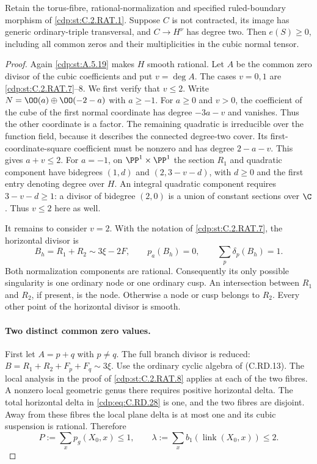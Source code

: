 
\begin{proposition}\label{cdp:st:C.2.RAT.9}
Retain the torus-fibre, rational-normalization and specified
ruled-boundary morphism of \ref{cdp:st:C.2.RAT.1}. Suppose $C$ is not
contracted, its image has generic ordinary-triple transversal,
and $C\to H^\nu$ has degree two. Then $e(S)\ge0$,
including all common zeros and their multiplicities in
the cubic normal tensor.
\end{proposition}
\begin{proof}
Again \ref{cdp:st:A.5.19} makes $H$ smooth rational. Let $A$ be the
common zero divisor of the cubic coefficients and put
$v=\deg A$. The cases $v=0,1$ are \ref{cdp:st:C.2.RAT.7}--8.
We first verify that $v\le2$. Write
$N=\OO(a)\oplus\OO(-2-a)$ with $a\ge-1$.
For $a\ge0$ and $v>0$, the coefficient of the cube
of the first normal coordinate has degree $-3a-v$
and vanishes. Thus the other coordinate is a factor.
The remaining quadratic is irreducible over the
function field, because it describes the connected
degree-two cover. Its first-coordinate-square
coefficient must be nonzero and has degree
$2-a-v$. This gives $a+v\le2$.
For $a=-1$, on $\PP^1\times\PP^1$ the section
$R_1$ and quadratic component have bidegrees
$(1,d)$ and $(2,3-v-d)$, with $d\ge0$ and the
first entry denoting degree over $H$. An integral
quadratic component requires $3-v-d\ge1$:
a divisor of bidegree $(2,0)$ is a union of
constant sections over $\C$. Thus $v\le2$ here
as well.

It remains to consider $v=2$. With the notation
of \ref{cdp:st:C.2.RAT.7}, the horizontal divisor is
\[
 B_h=R_1+R_2\sim3\xi-2F,
       \qquad p_a(B_h)=0,
       \qquad \sum_p\delta_p(B_h)=1.
\tag{C.RD.28}\label{cdp:eq:C.RD.28}
\]
Both normalization components are rational.
Consequently its only possible singularity is
one ordinary node or one ordinary cusp. An
intersection between $R_1$ and $R_2$, if present,
is the node. Otherwise a node or cusp belongs
to $R_2$. Every other point of the horizontal
divisor is smooth.

\paragraph{Two distinct common zero values.}
First let $A=p+q$ with $p\ne q$. The full branch
divisor is reduced:
$B=R_1+R_2+F_p+F_q\sim3\xi$.
Use the ordinary cyclic algebra of (C.RD.13).
The local analysis in the proof of \ref{cdp:st:C.2.RAT.8}
applies at each of the two fibres. A nonzero
local geometric genus there requires positive
horizontal delta. The total horizontal delta
in \eqref{cdp:eq:C.RD.28} is one, and the two fibres are
disjoint. Away from these fibres the local
plane delta is at most one and its cubic
suspension is rational. Therefore
\[
 P:=\sum_x p_g(X_0,x)\le1,\qquad
 \lambda:=\sum_x b_1(\operatorname{link}(X_0,x))\le2.
\tag{C.RD.29}\label{cdp:eq:C.RD.29}
\]


\end{proof}
